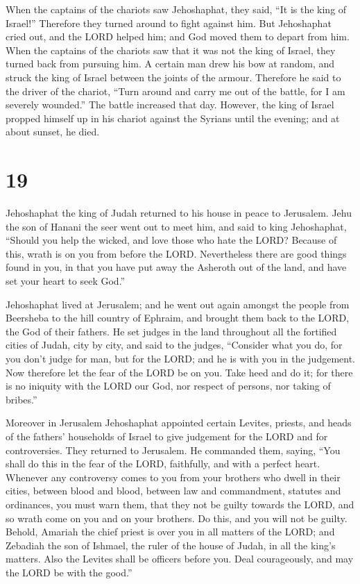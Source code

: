  When the captains of the chariots saw Jehoshaphat, they
said, ``It is the king of Israel!'' Therefore they turned around to
fight against him. But Jehoshaphat cried out, and the LORD helped him;
and God moved them to depart from him.  When the captains
of the chariots saw that it was not the king of Israel, they turned back
from pursuing him.  A certain man drew his bow at random,
and struck the king of Israel between the joints of the armour.
Therefore he said to the driver of the chariot, ``Turn around and carry
me out of the battle, for I am severely wounded.''  The
battle increased that day. However, the king of Israel propped himself
up in his chariot against the Syrians until the evening; and at about
sunset, he died.

\hypertarget{section-18}{%
\section{19}\label{section-18}}

 Jehoshaphat the king of Judah returned to his house in
peace to Jerusalem.  Jehu the son of Hanani the seer went
out to meet him, and said to king Jehoshaphat, ``Should you help the
wicked, and love those who hate the LORD? Because of this, wrath is on
you from before the LORD.  Nevertheless there are good
things found in you, in that you have put away the Asheroth out of the
land, and have set your heart to seek God.''

 Jehoshaphat lived at Jerusalem; and he went out again
amongst the people from Beersheba to the hill country of Ephraim, and
brought them back to the LORD, the God of their fathers.  He
set judges in the land throughout all the fortified cities of Judah,
city by city,  and said to the judges, ``Consider what you
do, for you don't judge for man, but for the LORD; and he is with you in
the judgement.  Now therefore let the fear of the LORD be on
you. Take heed and do it; for there is no iniquity with the LORD our
God, nor respect of persons, nor taking of bribes.''

 Moreover in Jerusalem Jehoshaphat appointed certain
Levites, priests, and heads of the fathers' households of Israel to give
judgement for the LORD and for controversies. They returned to
Jerusalem.  He commanded them, saying, ``You shall do this
in the fear of the LORD, faithfully, and with a perfect heart.
 Whenever any controversy comes to you from your brothers
who dwell in their cities, between blood and blood, between law and
commandment, statutes and ordinances, you must warn them, that they not
be guilty towards the LORD, and so wrath come on you and on your
brothers. Do this, and you will not be guilty.  Behold,
Amariah the chief priest is over you in all matters of the LORD; and
Zebadiah the son of Ishmael, the ruler of the house of Judah, in all the
king's matters. Also the Levites shall be officers before you. Deal
courageously, and may the LORD be with the good.''

